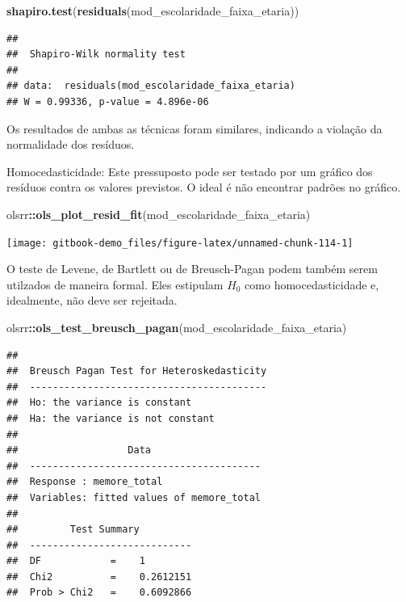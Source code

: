 \documentclass[
]{book}
\newenvironment{Shaded}{\begin{snugshade}}{\end{snugshade}}
\newcommand{\KeywordTok}[1]{\textcolor[rgb]{0.13,0.29,0.53}{\textbf{#1}}}
\newcommand{\NormalTok}[1]{#1}
\newcommand{\OperatorTok}[1]{\textcolor[rgb]{0.81,0.36,0.00}{\textbf{#1}}}
\begin{document}
\begin{Shaded}
\begin{Highlighting}[]
\KeywordTok{shapiro.test}\NormalTok{(}\KeywordTok{residuals}\NormalTok{(mod_escolaridade_faixa_etaria))}
\end{Highlighting}
\end{Shaded}

\begin{verbatim}
## 
##  Shapiro-Wilk normality test
## 
## data:  residuals(mod_escolaridade_faixa_etaria)
## W = 0.99336, p-value = 4.896e-06
\end{verbatim}

Os resultados de ambas as técnicas foram similares, indicando a violação da normalidade dos resíduos.

Homocedasticidade: Este pressuposto pode ser testado por um gráfico dos resíduos contra os valores previstos. O ideal é não encontrar padrões no gráfico.

\begin{Shaded}
\begin{Highlighting}[]
\NormalTok{olsrr}\OperatorTok{::}\KeywordTok{ols_plot_resid_fit}\NormalTok{(mod_escolaridade_faixa_etaria)}
\end{Highlighting}
\end{Shaded}

\begin{center}\texttt{[image: gitbook-demo\_files/figure-latex/unnamed-chunk-114-1]} \end{center}

O teste de Levene, de Bartlett ou de Breusch-Pagan podem também serem utilzados de maneira formal. Eles estipulam \(H_0\) como homocedasticidade e, idealmente, não deve ser rejeitada.

\begin{Shaded}
\begin{Highlighting}[]
\NormalTok{olsrr}\OperatorTok{::}\KeywordTok{ols_test_breusch_pagan}\NormalTok{(mod_escolaridade_faixa_etaria)}
\end{Highlighting}
\end{Shaded}

\begin{verbatim}
## 
##  Breusch Pagan Test for Heteroskedasticity
##  -----------------------------------------
##  Ho: the variance is constant            
##  Ha: the variance is not constant        
## 
##                   Data                   
##  ----------------------------------------
##  Response : memore_total 
##  Variables: fitted values of memore_total 
## 
##         Test Summary         
##  ----------------------------
##  DF            =    1 
##  Chi2          =    0.2612151 
##  Prob > Chi2   =    0.6092866
\end{verbatim}
\end{document}
